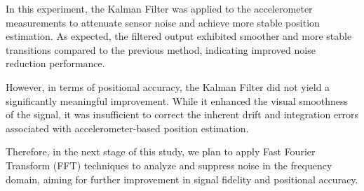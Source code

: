 \documentclass{article}
\begin{document}
In this experiment, the Kalman Filter was applied to the accelerometer measurements to attenuate sensor noise and achieve more stable position estimation. As expected, the filtered output exhibited smoother and more stable transitions compared to the previous method, indicating improved noise reduction performance.

However, in terms of positional accuracy, the Kalman Filter did not yield a significantly meaningful improvement. While it enhanced the visual smoothness of the signal, it was insufficient to correct the inherent drift and integration errors associated with accelerometer-based position estimation.

Therefore, in the next stage of this study, we plan to apply Fast Fourier Transform (FFT) techniques to analyze and suppress noise in the frequency domain, aiming for further improvement in signal fidelity and positional accuracy.
\end{document}
